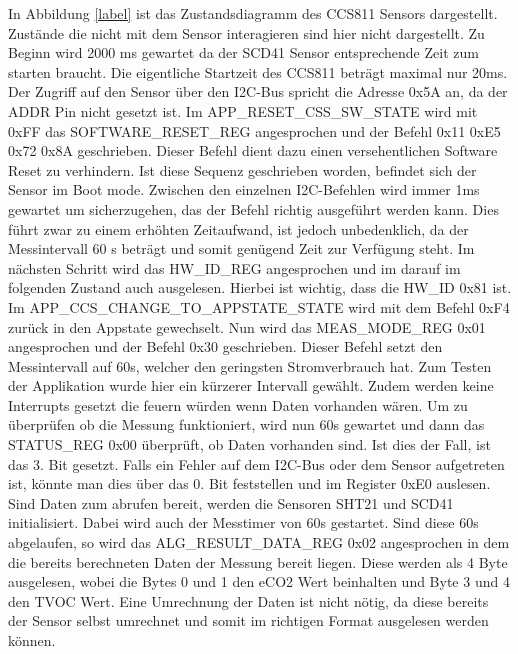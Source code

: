 \documentclass[]{article}
\begin{document}
			In Abbildung \ref{label} ist das Zustandsdiagramm des CCS811 Sensors dargestellt. Zustände die nicht mit dem Sensor interagieren sind hier nicht dargestellt. Zu Beginn wird 2000 ms gewartet da der SCD41 Sensor entsprechende Zeit zum starten braucht. Die eigentliche Startzeit des CCS811 beträgt maximal nur 20ms. Der Zugriff auf den Sensor über den I2C-Bus spricht die Adresse 0x5A an, da der ADDR Pin nicht gesetzt ist. Im APP\_RESET\_CSS\_SW\_STATE wird mit 0xFF das SOFTWARE\_RESET\_REG angesprochen und der Befehl 0x11 0xE5 0x72 0x8A geschrieben. Dieser Befehl dient dazu einen versehentlichen Software Reset zu verhindern. Ist diese Sequenz geschrieben worden, befindet sich der Sensor im Boot mode. Zwischen den einzelnen I2C-Befehlen wird immer 1ms gewartet um sicherzugehen, das der Befehl richtig ausgeführt werden kann. Dies führt zwar zu einem erhöhten Zeitaufwand, ist jedoch unbedenklich, da der Messintervall 60 s beträgt und somit genügend Zeit zur Verfügung steht. Im nächsten Schritt wird das HW\_ID\_REG angesprochen und im darauf im folgenden Zustand auch ausgelesen. Hierbei ist wichtig, dass die HW\_ID 0x81 ist. Im APP\_CCS\_CHANGE\_TO\_APPSTATE\_STATE wird mit dem Befehl 0xF4 zurück in den Appstate gewechselt. Nun wird das MEAS\_MODE\_REG 0x01 angesprochen und der Befehl 0x30 geschrieben. Dieser Befehl setzt den Messintervall auf 60s, welcher den geringsten Stromverbrauch hat. Zum Testen der Applikation wurde hier ein kürzerer Intervall gewählt. Zudem werden keine Interrupts gesetzt die feuern würden wenn Daten vorhanden wären. Um zu überprüfen ob die Messung funktioniert, wird nun 60s gewartet und dann das STATUS\_REG 0x00 überprüft, ob Daten vorhanden sind. Ist dies der Fall, ist das 3. Bit gesetzt. Falls ein Fehler auf dem I2C-Bus oder dem Sensor aufgetreten ist, könnte man dies über das 0. Bit feststellen und im Register 0xE0 auslesen. Sind Daten zum abrufen bereit, werden die Sensoren SHT21 und SCD41 initialisiert. Dabei wird auch der Messtimer von 60s gestartet. Sind diese 60s abgelaufen, so wird das ALG\_RESULT\_DATA\_REG 0x02 angesprochen in dem die bereits berechneten Daten der Messung bereit liegen. Diese werden als 4 Byte ausgelesen, wobei die Bytes 0 und 1 den eCO2 Wert beinhalten und Byte 3 und 4 den TVOC Wert. Eine Umrechnung der Daten ist nicht nötig, da diese bereits der Sensor selbst umrechnet und somit im richtigen Format ausgelesen werden können.
\end{document}
